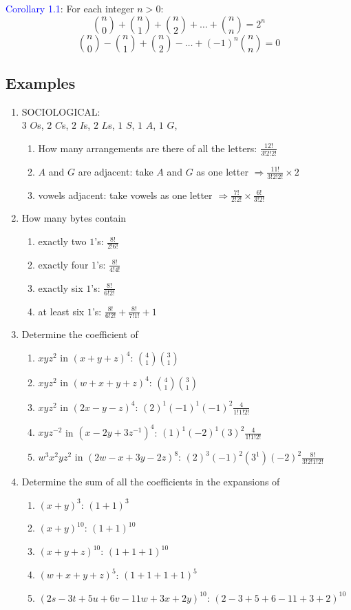 \documentclass[letter]{book}
\begin{document}
\textcolor{blue}{Corollary 1.1}: For each integer $n>0$:
$$
\binom{n}{0}+\binom{n}{1}+\binom{n}{2}+\dots+\binom{n}{n}=2^n
$$
$$
\binom{n}{0}-\binom{n}{1}+\binom{n}{2}-\dots+(-1)^n\binom{n}{n}=0
$$
\subsection*{Examples}
\begin{enumerate}
    \item SOCIOLOGICAL:\\
    $3$ $O$s, $2$ $C$s, $2$ $I$s, $2$ $L$s, $1$ $S$, $1$ $A$, $1$ $G$,  
    \begin{enumerate}
        \item How many arrangements are there of all the letters: $\frac{12!}{3!2!2!}$
        \item $A$ and $G$ are adjacent: take $A$ and $G$ as one letter $\Rightarrow \frac{11!}{3!2!2!}\times 2$
        \item vowels adjacent: take vowels as one letter $\Rightarrow\frac{7!}{2!2!}\times \frac{6!}{3!2!}$
    \end{enumerate}
    \item How many bytes contain
    \begin{enumerate}
        \item exactly two $1$'s: $\frac{8!}{2!6!}$
        \item exactly four $1$'s: $\frac{8!}{4!4!}$
        \item exactly six $1$'s: $\frac{8!}{6!2!}$
        \item at least six $1$'s: $\frac{8!}{6!2!}+\frac{8!}{7!1!}+1$
    \end{enumerate}
    \item Determine the coefficient of
    \begin{enumerate}
        \item $xyz^2$ in $(x+y+z)^4$: $\binom{4}{1}\binom{3}{1}$
        \item $xyz^2$ in $(w+x+y+z)^4$: $\binom{4}{1}\binom{3}{1}$
        \item $xyz^2$ in $(2x-y-z)^4$: $(2)^1(-1)^1(-1)^2\frac{4}{1!1!2!}$
        \item $xyz^{-2}$ in $(x-2y+3z^{-1})^4$: $(1)^1(-2)^1(3)^{2}\frac{4}{1!1!2!}$
        \item $w^3x^2yz^2$ in $(2w-x+3y-2z)^8$: $(2)^3(-1)^2(3^1)(-2)^2\frac{8!}{3!2!1!2!}$
    \end{enumerate}
    \item Determine the sum of all the coefficients in the expansions of
    \begin{enumerate}
        \item $(x+y)^3$: $(1+1)^3$
        \item $(x+y)^{10}$: $(1+1)^{10}$
        \item $(x+y+z)^{10}$: $(1+1+1)^{10}$
        \item $(w+x+y+z)^5$: $(1+1+1+1)^5$
        \item $(2s-3t+5u+6v-11w+3x+2y)^{10}$: $(2-3+5+6-11+3+2)^{10}$
    \end{enumerate}
\end{enumerate}
\end{document}
